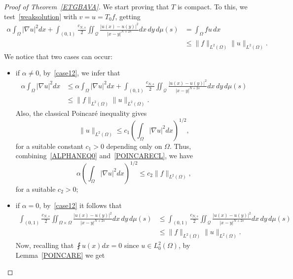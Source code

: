 \documentclass[12pt,a4paper,intlimits,sumlimits]{amsart}
\def \Q {\mathcal Q}
\theoremstyle{definition}
\theoremstyle{plain}
\numberwithin{equation}{section}
\renewcommand{\le}{\leqslant}
\begin{document}
\begin{proof}[Proof of Theorem~\ref{ETGBAVA}]
We start proving that $T$ is compact. To this,  we test~\eqref{weaksolution} with $v= u = T_0 f$, getting
\begin{equation}\label{case12}
\begin{split}
\alpha\int_\Omega |\nabla u|^2 dx +\int_{(0, 1)} \frac{c_{N, s}}{2} \iint_{\Q} \frac{|u(x)-u(y)|^2}{|x-y|^{N+2s}} dx\,dy\, d\mu(s)& = \int_\Omega f u \, dx\\
&\le \|f\|_{L^2(\Omega)}\|u\|_{L^2(\Omega)}.
\end{split}
\end{equation}
We notice that two cases can occur:
\begin{itemize}
\item if $\alpha\neq 0$,  by~\eqref{case12}, we infer that
\begin{equation}\label{ALPHANEQ0}
\begin{split}
\alpha\int_\Omega |\nabla u|^2 dx &\le \alpha\int_\Omega |\nabla u|^2 dx +\int_{(0, 1)} \frac{c_{N, s}}{2} \iint_{\Q} \frac{|u(x)-u(y)|^2}{|x-y|^{N+2s}} dx\,dy\, d\mu(s)\\
&\le \|f\|_{L^2(\Omega)}\|u\|_{L^2(\Omega)}.
\end{split}
\end{equation}
Also, the classical Poincaré inequality gives
\begin{equation}\label{POINCARECL}
\|u\|_{L^2(\Omega)}\le c_1 \left(\int_\Omega |\nabla u|^2 dx\right)^{1/2},
\end{equation}
for a suitable constant $c_1>0$ depending only on $\Omega$.  Thus, combining~\eqref{ALPHANEQ0} and~\eqref{POINCARECL}, we have
\begin{equation}\label{ALPHA1}
\alpha \left(\int_\Omega |\nabla u|^2 dx\right)^{1/2}\le c_2 \|f\|_{L^2(\Omega)},
\end{equation}
for a suitable $c_2>0$;
\item if $\alpha = 0$, by~\eqref{case12} it follows that
\begin{equation}\label{ALPHA=0}
\begin{split}
\int_{(0, 1)} \frac{c_{N, s}}{2} \iint_{\Omega\times\Omega} \frac{|u(x)-u(y)|^2}{|x-y|^{N+2s}} dx\,dy\, d\mu(s)&\le \int_{(0, 1)} \frac{c_{N, s}}{2} \iint_{\Q} \frac{|u(x)-u(y)|^2}{|x-y|^{N+2s}} dx\,dy\, d\mu(s)\\
& \le \|f\|_{L^2(\Omega)}\|u\|_{L^2(\Omega)}.
\end{split}
\end{equation}
Now, recalling that $\fint u (x) dx =0$ since $u\in L_0^2(\Omega)$,  by Lemma~\ref{POINCARE} we get

\end{itemize}
\end{proof}
\end{document}
